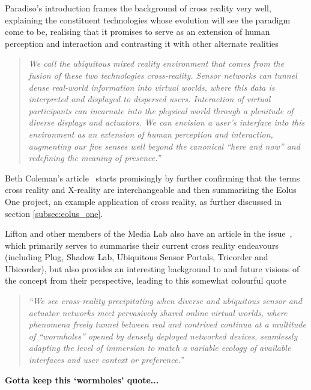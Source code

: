 Paradiso's introduction frames the background of cross reality very well, explaining the constituent technologies whose evolution will see the paradigm come to be, realising that it promises to serve as an extension of human perception and interaction and contrasting it with other alternate realities

\begin{quote}
\textit{We call the ubiquitous mixed reality environment that comes from the fusion of these two technologies cross-reality. Sensor networks can tunnel dense real-world information into virtual worlds, where this data is interpreted and displayed to dispersed users. Interaction of virtual participants can incarnate into the physical world through a plenitude of diverse displays and actuators. We can envision a user's interface into this environment as an extension of human perception and interaction, augmenting our five senses well beyond the canonical ``here and now'' and redefining the meaning of presence.''}
\end{quote}

Beth Coleman's article~\cite{Coleman2009} starts promisingly by further confirming that the terms cross reality and X-reality are interchangeable and then summarising the Eolus One project, an example application of cross reality, as further discussed in section \ref{subsec:eolus_one}.

Lifton and other members of the Media Lab also have an article in the issue~\cite{Lifton2009}, which primarily serves to summarise their current cross reality endeavours (including Plug, Shadow Lab, Ubiquitous Sensor Portals, Tricorder and Ubicorder), but also provides an interesting background to and future visions of the concept from their perspective, leading to this somewhat colourful quote

\begin{quote}
\textit{``We see cross-reality precipitating when diverse and ubiquitous sensor and actuator networks meet pervasively shared online virtual worlds, where phenomena freely tunnel between real and contrived continua at a multitude of ``wormholes'' opened by densely deployed networked devices, seamlessly adapting the level of immersion to match a variable ecology of available interfaces and user context or preference.''}
\end{quote}

\textbf{Gotta keep this `wormholes' quote...}

